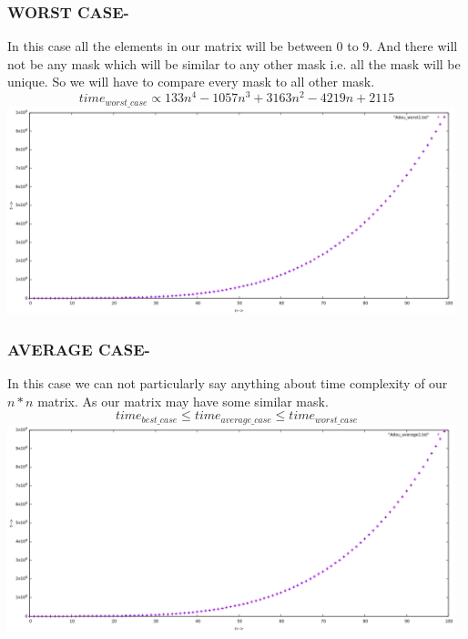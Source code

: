 \documentclass[conference]{IEEEtran}
\begin{document}
\subsubsection{\textbf{WORST CASE-}}
In this case all the elements in our matrix will be between 0 to 9. And there will not be any mask which will be similar to any other mask i.e. all the mask will be unique. So we will have to compare every mask to all other mask. 
\\$$time_{worst\_case} \propto 133n^4 -1057n^3 +3163n^2 - 4219n +2115$$
\includegraphics[height =  6.00cm,width = \linewidth]{worst.png}
\subsubsection{\textbf{AVERAGE CASE-}}
In this case we can not particularly say anything about time complexity of our $n*n$ matrix. As our matrix may have some similar mask.
\\ $$time_{best\_case} \leq time_{average\_case} \leq time_{worst\_case}$$
\includegraphics[height =  6.00cm,width = \linewidth]{average.png}
\end{document}
